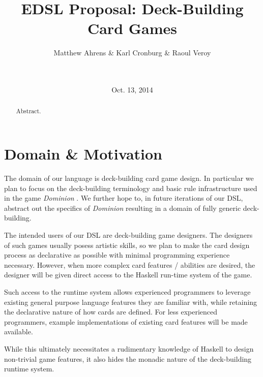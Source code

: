 \documentclass{acm_proc_article-sp}
\begin{document}
\title{EDSL Proposal: Deck-Building Card Games}

\author{
  \alignauthor
  Matthew Ahrens \& Karl Cronburg \& Raoul Veroy \\
   \\
         \\
}
\date{Oct. 13, 2014}

\maketitle

\begin{abstract}
Abstract.
\end{abstract}

\section{Domain \& Motivation}
\label{sec:domain}
%

The domain of our language is deck-building card game design. In particular we
plan to focus on the deck-building terminology and basic rule infrastructure
used in the game \emph{Dominion} \cite{Vaccarino2008}. We further hope to,
in future iterations of our DSL, abstract out the specifics of \emph{Dominion}
resulting in a domain of fully generic deck-building.

The intended users of our DSL are deck-building game designers. The designers
of such games usually posess artistic skills, so we plan to make the card
design process as declarative as possible with minimal programming experience
necessary. However, when more complex card features / abilities are
desired, the designer will be given direct access to the Haskell run-time
system of the game.

Such access to the runtime system allows experienced
programmers to leverage existing general purpose language features they
are familiar with, while retaining the declarative nature of how cards are
defined. For less experienced programmers, example implementations of
existing card features will be made available.

While this ultimately necessitates a rudimentary knowledge of Haskell
to design non-trivial game features, it also hides the monadic nature of
the deck-building runtime system.
\end{document}
